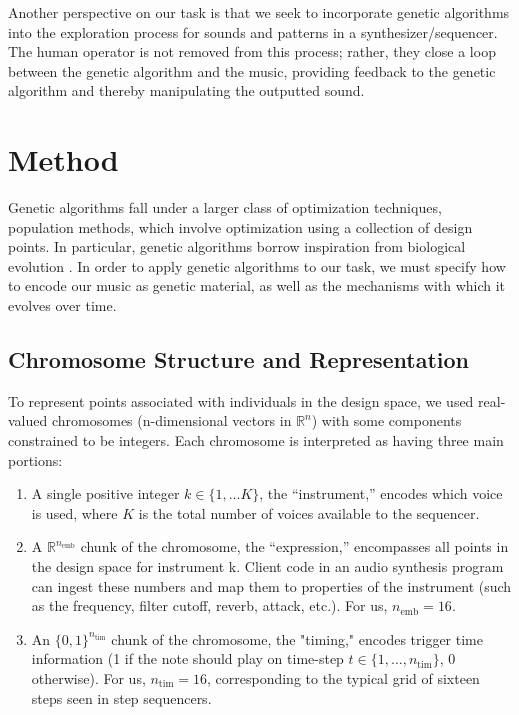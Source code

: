 \documentclass[conference]{IEEEtran}
\begin{document}
Another perspective on our task is that we seek to incorporate genetic
algorithms into the exploration process for sounds and patterns in a
synthesizer/sequencer. The human operator is not removed from this process;
rather, they close a loop between the genetic algorithm and the music,
providing feedback to the genetic algorithm and thereby manipulating the
outputted sound.

\section{Method}

Genetic algorithms fall under a larger class of optimization techniques,
population methods, which involve optimization using a collection of design
points. In particular, genetic algorithms borrow inspiration from biological
evolution \cite{genalg-textbook,textbook}. In order to apply genetic algorithms to our
task, we must specify how to encode our music as genetic material, as well as
the mechanisms with which it evolves over time.

\subsection{Chromosome Structure and Representation}

To represent points associated with individuals in the design space, we used
real-valued chromosomes (n-dimensional vectors in $\mathbb{R}^n$) with
some components constrained to be integers. Each chromosome is interpreted as
having three main portions:

\begin{enumerate}
    \item A single positive integer $k \in \{1, \dots K\}$, the ``instrument,'' encodes
          which voice is used, where $K$ is the total number of voices
          available to the
          sequencer.
    \item A $\mathbb{R}^{n_\text{emb}}$ chunk of the chromosome, the
          ``expression,'' encompasses all points in the design space for instrument k.
          Client code in an audio synthesis program can ingest these numbers and map them
          to properties of the instrument (such as the frequency, filter cutoff, reverb,
          attack, etc.). For us, $n_\text{emb} = 16$.
    \item An $\{0, 1\}^{n_\text{tim}}$ chunk of the chromosome, the "timing," encodes trigger
          time information (1 if the note should play on time-step $t \in \{1, \dots, n_\text{tim}\}$,
          0 otherwise). For us, $n_\text{tim} = 16$, corresponding to the typical grid
          of
          sixteen steps seen in step sequencers.
\end{enumerate}
\end{document}
